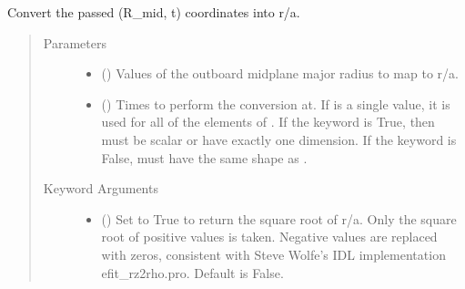 \documentclass[letterpaper,10pt,english]{sphinxmanual}
\begin{document}
\begin{fulllineitems}
\begin{fulllineitems}
\end{fulllineitems}


\begin{fulllineitems}
\label{\detokenize{eqtools:eqtools.core.Equilibrium.rmid2roa}}
Convert the passed (R\_mid, t) coordinates into r/a.
\begin{quote}\begin{description}
\item[{Parameters}] \leavevmode\begin{itemize}
\item {} 
 () \textendash{} Values of the outboard midplane
major radius to map to r/a.

\item {} 
 () \textendash{} Times to perform the conversion at.
If  is a single value, it is used for all of the elements of
. If the  keyword is True, then  must be scalar
or have exactly one dimension. If the  keyword is False,
 must have the same shape as .

\end{itemize}

\item[{Keyword Arguments}] \leavevmode\begin{itemize}
\item {} 
 () \textendash{} Set to True to return the square root of r/a.
Only the square root of positive values is taken. Negative
values are replaced with zeros, consistent with Steve Wolfe’s
IDL implementation efit\_rz2rho.pro. Default is False.


\end{itemize}
\end{description}
\end{quote}
\end{fulllineitems}
\end{fulllineitems}
\end{document}

